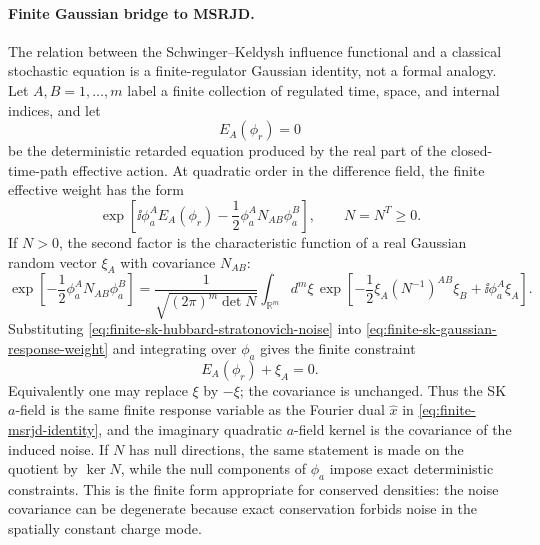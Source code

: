 \paragraph{Finite Gaussian bridge to MSRJD.}
The relation between the Schwinger--Keldysh influence functional and a
classical stochastic equation is a finite-regulator Gaussian identity, not a
formal analogy.  Let \(A,B=1,\ldots,m\) label a finite collection of
regulated time, space, and internal indices, and let
\[
  E_A(\phi_r)=0
\]
be the deterministic retarded equation produced by the real part of the
closed-time-path effective action.  At quadratic order in the difference
field, the finite effective weight has the form
\begin{equation}
  \exp\!\left[
    \ii \phi_a^A E_A(\phi_r)
    -\frac12\phi_a^A N_{AB}\phi_a^B
  \right],
  \qquad N=N^T\ge0 .
  \label{eq:finite-sk-gaussian-response-weight}
\end{equation}
If \(N>0\), the second factor is the characteristic function of a real
Gaussian random vector \(\xi_A\) with covariance \(N_{AB}\):
\begin{equation}
  \exp\!\left[-\frac12\phi_a^A N_{AB}\phi_a^B\right]
  =
  \frac{1}{\sqrt{(2\pi)^m\det N}}
  \int_{\mathbb R^m} d^m\xi\,
  \exp\!\left[
    -\frac12\xi_A(N^{-1})^{AB}\xi_B
    +\ii\phi_a^A\xi_A
  \right].
  \label{eq:finite-sk-hubbard-stratonovich-noise}
\end{equation}
Substituting \eqref{eq:finite-sk-hubbard-stratonovich-noise} into
\eqref{eq:finite-sk-gaussian-response-weight} and integrating over
\(\phi_a\) gives the finite constraint
\begin{equation}
  E_A(\phi_r)+\xi_A=0 .
  \label{eq:finite-sk-stochastic-equation}
\end{equation}
Equivalently one may replace \(\xi\) by \(-\xi\); the covariance is unchanged.
Thus the SK \(a\)-field is the same finite response variable as the Fourier
dual \(\hat x\) in \eqref{eq:finite-msrjd-identity}, and the imaginary
quadratic \(a\)-field kernel is the covariance of the induced noise.  If
\(N\) has null directions, the same statement is made on the quotient by
\(\ker N\), while the null components of \(\phi_a\) impose exact deterministic
constraints.  This is the finite form appropriate for conserved densities:
the noise covariance can be degenerate because exact conservation forbids
noise in the spatially constant charge mode.

